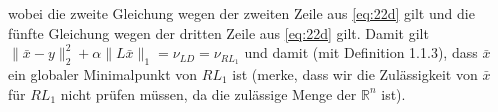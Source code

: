 \documentclass[ngerman, a4paper,12pt]{article}
\begin{document}
wobei die zweite Gleichung wegen der zweiten Zeile aus \eqref{eq:22d} gilt und die fünfte Gleichung wegen der dritten Zeile aus \eqref{eq:22d} gilt. Damit gilt $\|\bar{x} - y\|_2^2 + \alpha \| L\bar{x}\|_1 = \nu_{LD} = \nu_{RL_1}$ und damit (mit Definition 1.1.3), dass $\bar{x}$ ein globaler Minimalpunkt von $RL_1$ ist (merke, dass wir die Zulässigkeit von $\bar{x}$ für $RL_1$ nicht prüfen müssen, da die zulässige Menge der $\mathbb{R}^n$ ist).

\end{document}
